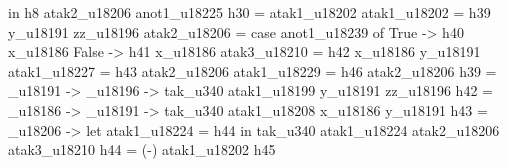                                                                                                                                               in h8 atak2_u18206 anot1_u18225
                                                                                                                        h30 = atak1_u18202
                                                                                                                        atak1_u18202 = h39 y_u18191 zz_u18196
                                                                                                                        atak2_u18206 = case anot1_u18239 of
                                                                                                                                         True ->
                                                                                                                                           h40 x_u18186
                                                                                                                                         False ->
                                                                                                                                           h41 x_u18186
                                                                                                                        atak3_u18210 = h42 x_u18186 y_u18191
                                                                                                                        atak1_u18227 = h43 atak2_u18206
                                                                                                                        atak1_u18229 = h46 atak2_u18206
                                                                                                                        h39 = \y_u18191 -> \zz_u18196 -> tak_u340 atak1_u18199 y_u18191 zz_u18196
                                                                                                                        h42 = \x_u18186 -> \y_u18191 -> tak_u340 atak1_u18208 x_u18186 y_u18191
                                                                                                                        h43 = _u18206 -> let
                                                                                                                                                 atak1_u18224 = h44
                                                                                                                                               in tak_u340 atak1_u18224 atak2_u18206 atak3_u18210
                                                                                                                        h44 = (-) atak1_u18202 h45
